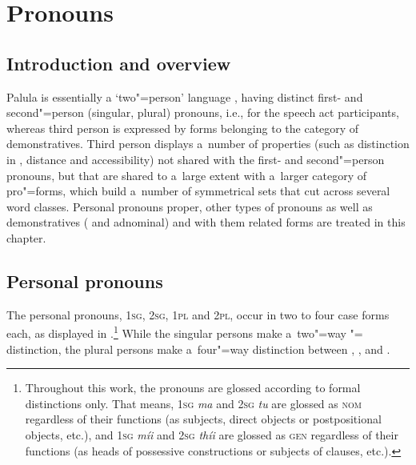 \chapter{Pronouns}
\label{chap:5}

\section{Introduction and overview}
\label{sec:5-1}


Palula is essentially a `two"=person' language \citep[4--15]{bhat2004}, having distinct first- and second"=person (singular, plural) pronouns, i.e., for the speech act participants, whereas third person is expressed by forms belonging to the category of demonstratives. Third person displays a~number of properties (such as distinction in , distance and accessibility) not shared with the first- and second"=person pronouns, but that are shared to a~large extent with a~larger category of pro"=forms, which build a~number of symmetrical sets that cut across several word classes. Personal pronouns proper, other types of pronouns as well as demonstratives ( and adnominal) and with them related forms are treated in this chapter.


\section{Personal pronouns}
\label{sec:5-2}

The personal pronouns, \textsc{1sg}, \textsc{2sg}, \textsc{1pl} and \textsc{2pl}, occur in two to four case forms each, as displayed in .\footnote{Throughout this work, the pronouns are glossed according to formal distinctions only. That means, \textsc{1sg} \textit{ma} and \textsc{2sg} \textit{tu} are glossed as \textsc{nom} regardless of their functions (as subjects, direct objects or postpositional objects, etc.), and \textsc{1sg} \textit{míi} and \textsc{2sg} \textit{thíi} are glossed as \textsc{gen} regardless of their functions (as heads of possessive constructions or subjects of   clauses, etc.).} While the singular persons make a~two"=way "= distinction, the plural persons make a~four"=way distinction between , ,  and .


